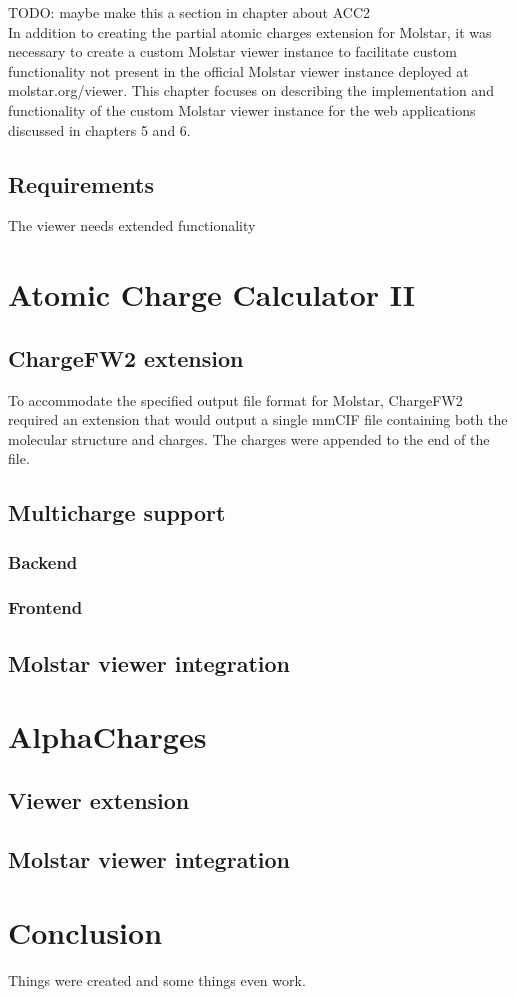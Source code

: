\documentclass[
  digital,     %
  oneside,     %
  nosansbold,  %
  nocolorbold, %
  lof,         %
  lot,         %
]{fithesis4}
\begin{document}
TODO: maybe make this a section in chapter about ACC2 \\

In addition to creating the partial atomic charges extension for Molstar, it was necessary to create a custom Molstar viewer instance to facilitate custom functionality not present in the official Molstar viewer instance deployed at molstar.org/viewer. This chapter focuses on describing the implementation and functionality of the custom Molstar viewer instance for the web applications discussed in chapters 5 and 6.

\section{Requirements}

The viewer needs extended functionality

\chapter{Atomic Charge Calculator II}

\section{ChargeFW2 extension}

To accommodate the specified output file format for Molstar, ChargeFW2 required an extension that would output a single mmCIF file containing both the molecular structure and charges. The charges were appended to the end of the file.

\section{Multicharge support}

\subsection{Backend}

\subsection{Frontend}

\section{Molstar viewer integration}

\chapter{AlphaCharges}
\section{Viewer extension}
\section{Molstar viewer integration}


\chapter*{Conclusion}

Things were created and some things even work.
\end{document}
